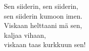 
Sen siiderin, sen siiderin, \\ sen siiderin kumoon imen. \\ Viskaan helttaani mä sen, \\ kaljaa vihaan, \\ viskaan taas kurkkuun sen!